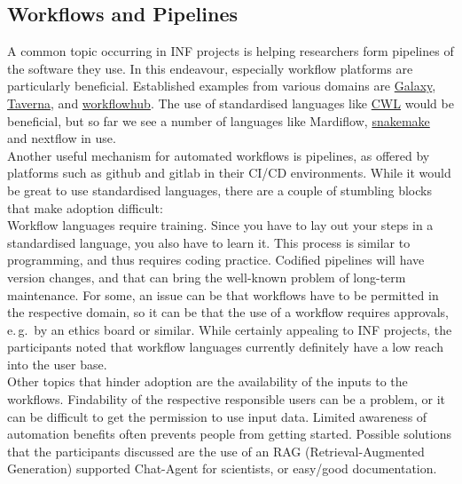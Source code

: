 \documentclass{eceasst}
\newcommand{\eg}{e.\,g.}
\begin{document}
\subsection{Workflows and Pipelines}
A common topic occurring in INF projects is helping researchers form pipelines of the software they use.
In this endeavour, especially workflow platforms are particularly beneficial.
Established examples from various domains are \href{https://galaxyproject.github.io/}{Galaxy}, \href{https://esciencelab.org.uk/products/taverna/}{Taverna}, and \href{https://workflowhub.eu/}{workflowhub}.
The use of standardised languages like \href{https://www.commonwl.org/}{CWL} would be beneficial, but so far we see a number of languages
like Mardiflow, \href{https://snakemake.readthedocs.io/en/stable/}{snakemake} and nextflow in use.\\
Another useful mechanism for automated workflows is pipelines,
as offered by platforms such as github and gitlab in their CI/CD environments.
While it would be great to use standardised languages, there are a couple of stumbling blocks that make adoption difficult:\\
Workflow languages require training.
Since you have to lay out your steps in a standardised language, you also have to learn it.
This process is similar to programming, and thus requires coding practice.
Codified pipelines will have version changes, and that can bring the well-known problem of long-term maintenance.
For some, an issue can be that workflows have to be permitted in the respective domain,
so it can be that the use of a workflow requires approvals, \eg~by an ethics board or similar.
While certainly appealing to INF projects, the participants noted that
workflow languages currently definitely have a low reach into the user base.\\
Other topics that hinder adoption are the availability of the inputs to the workflows.
Findability of the respective responsible users can be a problem, or
it can be difficult to get the permission to use input data.
Limited awareness of automation benefits often prevents people from getting started.
Possible solutions that the participants discussed are the use of an RAG (Retrieval-Augmented Generation) supported Chat-Agent for scientists,
or easy/good documentation.
\vspace{-1em}
\end{document}

